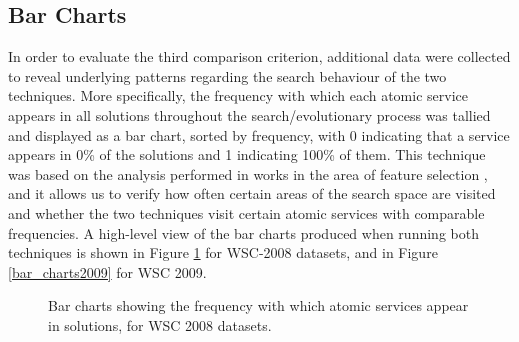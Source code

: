 \documentclass{llncs}
\begin{document}
\subsection{Bar Charts}

In order to evaluate the third comparison criterion, additional data were collected to reveal underlying patterns regarding the search behaviour of the two techniques. More specifically, the frequency with which each atomic service appears in all solutions throughout the search/evolutionary process was tallied and displayed as a bar chart, sorted by frequency, with 0 indicating that a service appears in 0\% of the solutions and 1 indicating 100\% of them. This technique was based on the analysis performed in works in the area of feature selection \cite{NguyenEvoStar2015,filterWrapperCEC2015}, and it allows us to verify how often certain areas of the search space are visited and whether the two techniques visit certain atomic services with comparable frequencies. A high-level view of the bar charts produced when running both techniques is shown in Figure \ref{bar_charts2008} for WSC-2008 datasets, and in Figure \ref{bar_charts2009} for WSC 2009.

\begin{figure}[h]
\centerline{
}
 \caption{Bar charts showing the frequency with which atomic services appear in solutions, for WSC 2008 datasets.}
 \label{bar_charts2008}
\end{figure}
\end{document}
